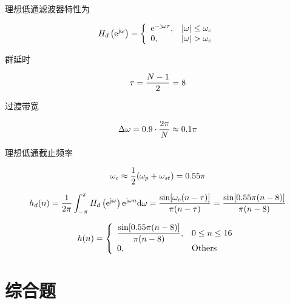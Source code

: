 \documentclass[cn, hazy, blue, normal, 14pt]{elegantnote}
\begin{document}
\begin{solution}[print=true]

理想低通滤波器特性为

\begin{equation}
\notag
    H_d\left(\text{e}^{\text{j}\omega}\right)=\left\{
    \begin{array}{ll}
        \text{e}^{-\text{j}\omega\tau}, & |\omega|\leq\omega_c \\
        0, & |\omega|>\omega_c
    \end{array}
    \right.
\end{equation}

群延时

\begin{equation}
\notag
    \tau=\frac{N-1}{2}=8
\end{equation}

过渡带宽

\begin{equation}
\notag
    \Delta\omega=0.9\cdot\frac{2\pi}{N}\approx 0.1\pi
\end{equation}

理想低通截止频率

\begin{equation}
\notag
    \omega_c\approx\frac{1}{2}(\omega_p+\omega_{st})=0.55\pi
\end{equation}

\begin{equation}
\notag
    h_d(n)=\frac{1}{2\pi}\int_{-\pi}^{\pi}H_d\left(\text{e}^{\text{j}\omega}\right)\text{e}^{\text{j}\omega n}\text{d}\omega=\frac{\sin[\omega_c(n-\tau)]}{\pi(n-\tau)}=\frac{\sin[0.55\pi(n-8)]}{\pi(n-8)}
\end{equation}

\begin{equation}
\notag
    h(n)=\left\{
    \begin{array}{ll}
        \dfrac{\sin[0.55\pi(n-8)]}{\pi(n-8)}, & 0\leq n\leq 16 \\
        0, & \text{Others}
    \end{array}
    \right.
\end{equation}

\end{solution}


\section{综合题}
\end{document}
